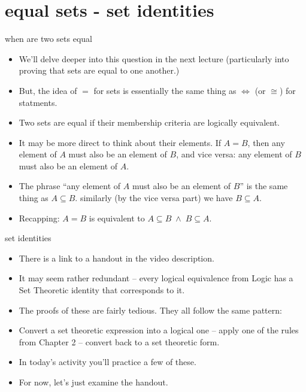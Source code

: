 \documentclass[handout,landscape]{beamer}
\begin{document}
\section{equal sets - set identities}

\begin{frame}{when are two sets equal}
\begin{itemize}
\item We'll delve deeper into this question in the next lecture (particularly into proving that sets are equal to one another.) \pause
\item But, the idea of $=$ for sets is essentially the same thing as $\iff$ \newline (or $\cong$) for statments. \pause
\item Two sets are equal if their membership criteria are logically equivalent. \pause
\item It may be more direct to think about their elements. If $A=B$, then any element of $A$ must also be an element of $B$, and vice versa: any element of $B$ must also be an element of $A$. \pause 
\item The phrase ``any element of $A$ must also be an element of $B$'' is the same thing as $A \subseteq B$. \pause \newline
similarly (by the vice versa part) we have $B \subseteq A$. \pause
\item Recapping: \pause $A = B$ is equivalent to $A \subseteq B \; \land \; B \subseteq A$.
\end{itemize}
\end{frame}

\begin{frame}{set identities}
\begin{itemize}
\item There is a link to a handout in the video description. \pause
\item It may seem rather redundant -- every logical equivalence from Logic has a Set Theoretic identity that corresponds to it. \pause
\item The proofs of these are fairly tedious. They all follow the same pattern: \pause 
\item Convert a set theoretic expression into a logical one -- apply one of the rules from Chapter 2 -- convert back to a set theoretic form. \pause
\item In today's activity you'll practice a few of these. \pause
\item For now, let's just examine the handout.

\end{itemize}
\end{frame}
\end{document}
